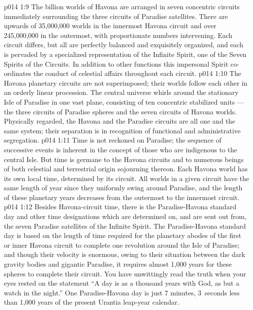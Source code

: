 \vs p014 1:9 \pc The billion worlds of Havona are arranged in seven concentric circuits immediately surrounding the three circuits of Paradise satellites. There are upwards of 35,000,000 worlds in the innermost Havona circuit and over 245,000,000 in the outermost, with proportionate numbers intervening. Each circuit differs, but all are perfectly balanced and exquisitely organized, and each is pervaded by a specialized representation of the Infinite Spirit, one of the Seven Spirits of the Circuits. In addition to other functions this impersonal Spirit co\hyp{}ordinates the conduct of celestial affairs throughout each circuit.
\vs p014 1:10 The Havona planetary circuits are not superimposed; their worlds follow each other in an orderly linear procession. The central universe whirls around the stationary Isle of Paradise in one vast plane, consisting of ten concentric stabilized units --- the three circuits of Paradise spheres and the seven circuits of Havona worlds. Physically regarded, the Havona and the Paradise circuits are all one and the same system; their separation is in recognition of functional and administrative segregation.
\vs p014 1:11 \pc Time is not reckoned on Paradise; the sequence of successive events is inherent in the concept of those who are indigenous to the central Isle. But time is germane to the Havona circuits and to numerous beings of both celestial and terrestrial origin sojourning thereon. Each Havona world has its own local time, determined by its circuit. All worlds in a given circuit have the same length of year since they uniformly swing around Paradise, and the length of these planetary years decreases from the outermost to the innermost circuit.
\vs p014 1:12 Besides Havona\hyp{}circuit time, there is the Paradise\hyp{}Havona standard day and other time designations which are determined on, and are sent out from, the seven Paradise satellites of the Infinite Spirit. The Paradise\hyp{}Havona standard day is based on the length of time required for the planetary abodes of the first or inner Havona circuit to complete one revolution around the Isle of Paradise; and though their velocity is enormous, owing to their situation between the dark gravity bodies and gigantic Paradise, it requires almost 1,000 years for these spheres to complete their circuit. You have unwittingly read the truth when your eyes rested on the statement “A day is as a thousand years with God, as but a watch in the night.” One Paradise\hyp{}Havona day is just 7 minutes, 3\, seconds less than 1,000 years of the present Urantia leap\hyp{}year calendar.
